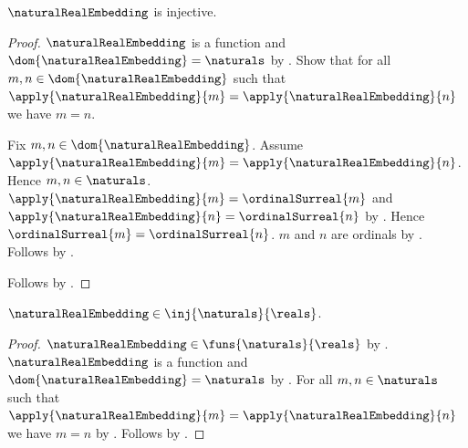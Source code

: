 \begin{proposition}\label{natural_real_embedding_injective}
    $\naturalRealEmbedding$ is injective.
\end{proposition}
\begin{proof}
    $\naturalRealEmbedding$ is a function and
        $\dom{\naturalRealEmbedding}=\naturals$ by
        .
    Show that for all $m,n\in\dom{\naturalRealEmbedding}$ such that
        $\apply{\naturalRealEmbedding}{m}
            =\apply{\naturalRealEmbedding}{n}$ we have
        $m=n$.
    \begin{subproof}
        Fix $m,n\in\dom{\naturalRealEmbedding}$.
        Assume $\apply{\naturalRealEmbedding}{m}
            =\apply{\naturalRealEmbedding}{n}$.
        Hence $m,n\in\naturals$.
        $\apply{\naturalRealEmbedding}{m}=\ordinalSurreal{m}$ and
            $\apply{\naturalRealEmbedding}{n}=\ordinalSurreal{n}$ by
            .
        Hence $\ordinalSurreal{m}=\ordinalSurreal{n}$.
        $m$ and $n$ are ordinals by .
        Follows by .
    \end{subproof}
    Follows by .
\end{proof}

\begin{theorem}\label{natural_real_embedding_is_injection}
    $\naturalRealEmbedding\in\inj{\naturals}{\reals}$.
\end{theorem}
\begin{proof}
    $\naturalRealEmbedding\in\funs{\naturals}{\reals}$ by
        .
    $\naturalRealEmbedding$ is a function and
        $\dom{\naturalRealEmbedding}=\naturals$ by
        .
    For all $m,n\in\naturals$ such that
        $\apply{\naturalRealEmbedding}{m}
            =\apply{\naturalRealEmbedding}{n}$ we have $m=n$ by
        .
    Follows by .
\end{proof}

